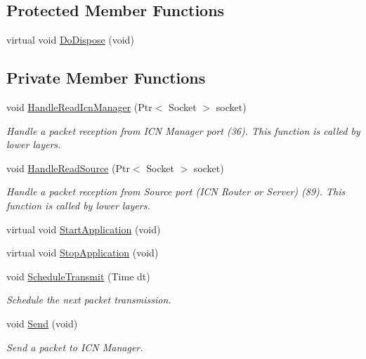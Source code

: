 \subsection*{Protected Member Functions}
\begin{DoxyCompactItemize}
\item 
virtual void \hyperlink{classns3_1_1OicnClient_a31a8c315ffb1b3fd93b6fefd596921f1}{Do\-Dispose} (void)
\end{DoxyCompactItemize}
\subsection*{Private Member Functions}
\begin{DoxyCompactItemize}
\item 
void \hyperlink{classns3_1_1OicnClient_ac8a14bcce5fe31183ef90953041ab085}{Handle\-Read\-Icn\-Manager} (Ptr$<$ Socket $>$ socket)
\begin{DoxyCompactList}\small\item\em Handle a packet reception from I\-C\-N Manager port (36). This function is called by lower layers. \end{DoxyCompactList}\item 
void \hyperlink{classns3_1_1OicnClient_a5ec54db1f765e9694893eb16ea3bc1fd}{Handle\-Read\-Source} (Ptr$<$ Socket $>$ socket)
\begin{DoxyCompactList}\small\item\em Handle a packet reception from Source port (I\-C\-N Router or Server) (89). This function is called by lower layers. \end{DoxyCompactList}\item 
virtual void \hyperlink{classns3_1_1OicnClient_aef6c598503b815369cb5aca8c258d1b5}{Start\-Application} (void)
\item 
virtual void \hyperlink{classns3_1_1OicnClient_ad25f24d5c9067270e34762850d820959}{Stop\-Application} (void)
\item 
void \hyperlink{classns3_1_1OicnClient_afbc13131125b275ae6075a76bef32e45}{Schedule\-Transmit} (Time dt)
\begin{DoxyCompactList}\small\item\em Schedule the next packet transmission. \end{DoxyCompactList}\item 
void \hyperlink{classns3_1_1OicnClient_aa6912792d6fa9c629fc2d01607476537}{Send} (void)
\begin{DoxyCompactList}\small\item\em Send a packet to I\-C\-N Manager. \end{DoxyCompactList}\end{DoxyCompactItemize}
